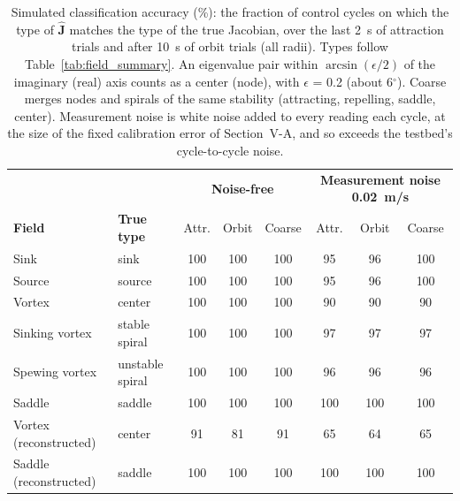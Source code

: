\begin{table}[!t]
\centering
\footnotesize
\caption{Simulated classification accuracy (\%): the fraction of control cycles on which the type of $\hat{\mathbf{J}}$ matches the type of the true Jacobian, over the last 2~s of attraction trials and after 10~s of orbit trials (all radii). Types follow Table~\ref{tab:field_summary}. An eigenvalue pair within $\arcsin(\epsilon/2)$ of the imaginary (real) axis counts as a center (node), with $\epsilon$ = 0.2 (about 6$^\circ$). Coarse merges nodes and spirals of the same stability (attracting, repelling, saddle, center). Measurement noise is white noise added to every reading each cycle, at the size of the fixed calibration error of Section~V-A, and so exceeds the testbed's cycle-to-cycle noise.}
\label{tab:classification}
\setlength{\tabcolsep}{3pt}
\begin{tabular}{ll|ccc|ccc}
\hline
 & & \multicolumn{3}{c|}{\textbf{Noise-free}} & \multicolumn{3}{c}{\textbf{Measurement noise 0.02~m/s}} \\
\textbf{Field} & \textbf{True type} & Attr. & Orbit & Coarse & Attr. & Orbit & Coarse \\
\hline
Sink & sink & 100 & 100 & 100 & 95 & 96 & 100 \\
Source & source & 100 & 100 & 100 & 95 & 96 & 100 \\
Vortex & center & 100 & 100 & 100 & 90 & 90 & 90 \\
Sinking vortex & stable spiral & 100 & 100 & 100 & 97 & 97 & 97 \\
Spewing vortex & unstable spiral & 100 & 100 & 100 & 96 & 96 & 96 \\
Saddle & saddle & 100 & 100 & 100 & 100 & 100 & 100 \\
Vortex (reconstructed) & center & 91 & 81 & 91 & 65 & 64 & 65 \\
Saddle (reconstructed) & saddle & 100 & 100 & 100 & 100 & 100 & 100 \\
\hline
\end{tabular}
\end{table}

